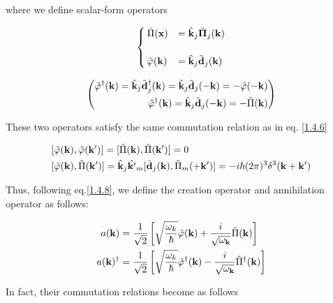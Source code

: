 where we define scalar-form operators

\[\begin{cases}
\tilde{\Pi}({\bf x})& = \hat{\bf k}_j\tilde{\bm \Pi}_j({\bf k})\\
&\\
\tilde{\varphi}({\bf k})& = \hat{\bf k}_j\tilde{\bf d}_j({\bf k})
\end{cases} \]

\[\left(\begin{split}
\tilde{\varphi}^\dagger({\bf k})= \hat{\bf k}_j\tilde{\bf d}_j^\dagger({\bf k}) = \hat{\bf k}_j\tilde{\bf d}_j(-{\bf k}) = -\tilde{\varphi}(-\bf k)\\
\tilde{\varphi}^\dagger({\bf k}) = \hat{\bf k}_j\tilde{\bf d}_j(-{\bf k}) = -\tilde{\Pi}({\bf k})
\end{split}\right) \]

These two operators satisfy the same commutation relation as in eq. \eqref{1.4.6}

\[\begin{split}
&[\tilde\varphi({\bf k}),\tilde\varphi({\bf k'})] = [\tilde\Pi({\bf k}),\tilde\Pi({\bf k'})] = 0\\
&[\tilde\varphi({\bf k}),\tilde\Pi({\bf k'})] = \hat{\bf k}_j\hat{\bf k'}_m[\tilde{\bf d}_j({\bf k}),\tilde\Pi_m({+\bf k'})] = -i\hbar(2\pi)^3\delta^3({\bf k+k'})
\end{split}\]

Thus, following eq.\eqref{1.4.8}, we define the creation operator and annihilation operator as follows:

\[\begin{split}
a({\bf k}) &= \frac{1}{\sqrt{2}}\left[\sqrt{\frac{\omega_k}{\hbar}}\tilde{\varphi}({\bf k})+\frac{i}{\sqrt{\omega_{\bf k}}}\tilde{\Pi}({\bf k})\right]\\
a({\bf k})^\dagger &= \frac{1}{\sqrt{2}}\left[\sqrt{\frac{\omega_k}{\hbar}}\tilde{\varphi}^\dagger({\bf k})-\frac{i}{\sqrt{\omega_{\bf k}}}\tilde{\Pi}^\dagger({\bf k})\right]
\end{split} \]

In fact, their commutation relations become as follows


